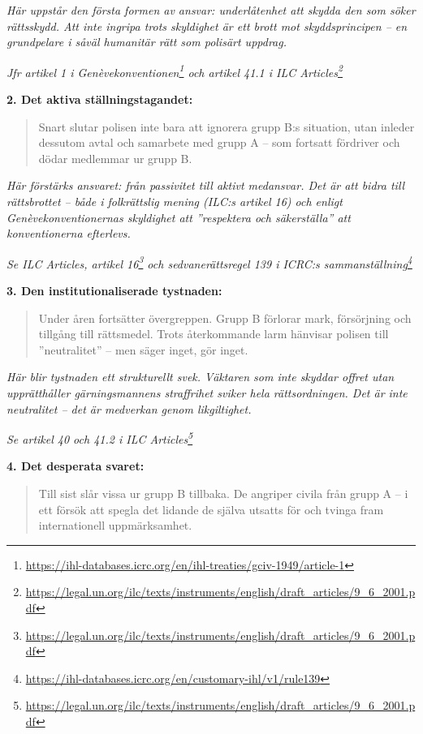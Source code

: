 \documentclass[12pt]{article}
\newcommand{\lagrum}[1]{\par\vspace{3mm}\textit{#1}\par\vspace{5mm}}
\begin{document}
\textit{Här uppstår den första formen av ansvar: underlåtenhet att skydda den som söker rättsskydd. Att inte ingripa trots skyldighet är ett brott mot skyddsprincipen – en grundpelare i såväl humanitär rätt som polisärt uppdrag.}
\lagrum{Jfr artikel 1 i Genèvekonventionen\footnote{\url{https://ihl-databases.icrc.org/en/ihl-treaties/gciv-1949/article-1}} och artikel 41.1 i ILC Articles\footnote{\url{https://legal.un.org/ilc/texts/instruments/english/draft_articles/9_6_2001.pdf}}}

\textbf{2. Det aktiva ställningstagandet:}
\begin{quote}
Snart slutar polisen inte bara att ignorera grupp B:s situation, utan inleder dessutom avtal och samarbete med grupp A – som fortsatt fördriver och dödar medlemmar ur grupp B.
\end{quote}

\textit{Här förstärks ansvaret: från passivitet till aktivt medansvar. Det är att bidra till rättsbrottet – både i folkrättslig mening (ILC:s artikel 16) och enligt Genèvekonventionernas skyldighet att ”respektera och säkerställa” att konventionerna efterlevs.}
\lagrum{Se ILC Articles, artikel 16\footnote{\url{https://legal.un.org/ilc/texts/instruments/english/draft_articles/9_6_2001.pdf}} och sedvanerättsregel 139 i ICRC:s sammanställning\footnote{\url{https://ihl-databases.icrc.org/en/customary-ihl/v1/rule139}}}

\textbf{3. Den institutionaliserade tystnaden:}
\begin{quote}
Under åren fortsätter övergreppen. Grupp B förlorar mark, försörjning och tillgång till rättsmedel. Trots återkommande larm hänvisar polisen till ”neutralitet” – men säger inget, gör inget.
\end{quote}

\textit{Här blir tystnaden ett strukturellt svek. Väktaren som inte skyddar offret utan upprätthåller gärningsmannens straffrihet sviker hela rättsordningen. Det är inte neutralitet – det är medverkan genom likgiltighet.}
\lagrum{Se artikel 40 och 41.2 i ILC Articles\footnote{\url{https://legal.un.org/ilc/texts/instruments/english/draft_articles/9_6_2001.pdf}}}

\textbf{4. Det desperata svaret:}
\begin{quote}
Till sist slår vissa ur grupp B tillbaka. De angriper civila från grupp A – i ett försök att spegla det lidande de själva utsatts för och tvinga fram internationell uppmärksamhet.
\end{quote}
\end{document}
